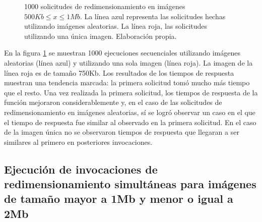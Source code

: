 \begin{figure}[h]
\hspace{-1.5cm}
\caption[\hspace{0.2cm} 1000 solicitudes de redimensionamiento en imágenes $500Kb \leq x \leq 1Mb$]{1000 solicitudes de redimensionamiento en imágenes $500Kb \leq x \leq 1Mb$. La línea azul representa las solicitudes hechas utilizando imágenes aleatorias. La línea roja, las solicitudes utilizando una única imagen. Elaboración propia.}
\label{fig:1000-ejecuciones-secuenciales-1mb}
\end{figure}

En la figura \ref{fig:1000-ejecuciones-secuenciales-1mb} se muestran 1000 ejecuciones secuenciales utilizando imágenes aleatorias (línea azul) y utilizando una sola imagen (línea roja). La imagen de la línea roja es de tamaño 750Kb. Los resultados de los tiempos de respuesta muestran una tendencia marcada: la primera solicitud tomó mucho más tiempo que el resto. Una vez realizada la primera solicitud, los tiempos de respuesta de la función mejoraron considerablemente y, en el caso de las solicitudes de redimensionamiento en imágenes aleatorias, sí se logró observar un caso en el que el tiempo de respuesta fue similar al observado en la primera solicitud. En el caso de la imagen única no se observaron tiempos de respuesta que llegaran a ser similares al primero en posteriores invocaciones. 


\subsection{Ejecución de invocaciones de redimensionamiento simultáneas para imágenes de tamaño mayor a 1Mb y menor o igual a 2Mb}


